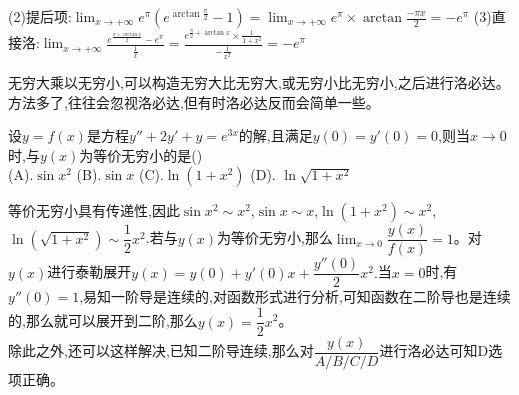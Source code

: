 \documentclass[12pt, a4paper, oneside, UTF8]{ctexbook}
\begin{document}
\begin{sloppypar}
\begin{solution}
        (2)提后项:$\lim_{x\to +\infty}e^\pi(e^{\arctan \frac{\pi}{2}}-1)=\lim_{x\to +\infty}e^\pi\times\arctan \frac{-\pi x}{2}=-e^\pi$\newline
        (3)直接洛:$\lim_{x\to +\infty}\frac{e^{\frac{\pi+\arctan x}{2}}-e^\pi}{\frac{1}{x}}=\frac{e^{\frac{\pi}{2}+\arctan x}\times\frac{1}{1+x^{2}}}{-\frac{1}{x^{2}}}=-e^\pi$\newline
    \end{solution}
    \begin{note}
        无穷大乘以无穷小,可以构造无穷大比无穷大,或无穷小比无穷小,之后进行洛必达。方法多了,往往会忽视洛必达,但有时洛必达反而会简单一些。
    \end{note}
    \begin{problem}
        设$y=f(x)$是方程$y''+2y'+y=e^{3x}$的解,且满足$y(0)=y'(0)=0$,则当$x\to 0$时,与$y(x)$为等价无穷小的是()\\
        (A).$\sin x^2$ \qquad (B).$\sin x$ \qquad (C).$\ln(1+x^2)$ \qquad (D). $\ln \sqrt{1+x^2}$
    \end{problem}
    \begin{solution}
        等价无穷小具有传递性,因此$\sin x^2 \sim x^2$,$\sin x \sim x$,$\ln (1+x^2) \sim x^2$,$\ln (\sqrt{1+x^2})\sim \dfrac{1}{2}x^2$.若与$y(x)$为等价无穷小,那么$\lim_{x\to 0}\dfrac{y(x)}{f(x)}=1$。对$y(x)$进行泰勒展开$y(x)=y(0)+y'(0)x+\dfrac{y''(0)}{2}x^2.$当$x=0$时,有$y''(0)=1$,易知一阶导是连续的,对函数形式进行分析,可知函数在二阶导也是连续的,那么就可以展开到二阶,那么$y(x)=\dfrac{1}{2}x^2$。\\
        除此之外,还可以这样解决,已知二阶导连续,那么对$\dfrac{y(x)}{A/B/C/D}$进行洛必达可知D选项正确。
    \end{solution}

\end{sloppypar}
\end{document}
